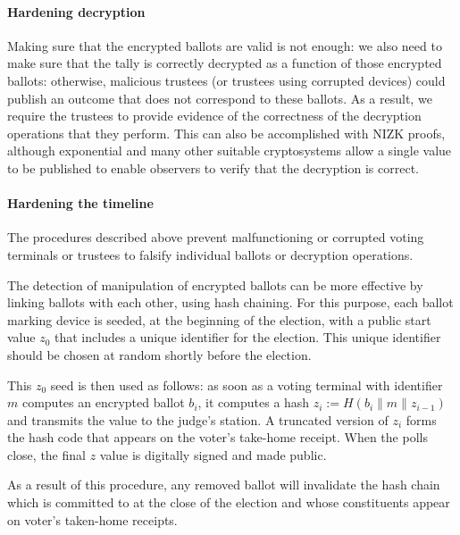 \paragraph{Hardening decryption}
\label{sec:hardening-decryption}
Making sure that the encrypted ballots are valid is not enough: we
also need to make sure that the tally is correctly decrypted as a
function of those encrypted ballots: otherwise, malicious trustees (or
trustees using corrupted devices) could publish an outcome that does
not correspond to these ballots. As a result, we require the trustees
to provide evidence of the correctness of the decryption operations
that they perform.  This can also be accomplished with NIZK proofs,
although exponential \elgamal and many other suitable cryptosystems
allow a single value to be published to enable observers to verify that
the decryption is correct.

\paragraph{Hardening the timeline}
\label{sec:hard-timeline}

The procedures described above prevent malfunctioning or corrupted
voting terminals or trustees to falsify individual ballots or decryption
operations.

The detection of manipulation of encrypted ballots can be more
effective by linking ballots with each other, using hash chaining.
For this purpose, each ballot marking device is seeded, at the beginning
of the election, with a public start value $z_0$ that includes a
unique identifier for the election.
This unique identifier should be chosen at random shortly before the
election.


This $z_0$ seed is then used as follows: as soon as a voting terminal
with identifier $m$ computes an encrypted ballot $b_i$, it
computes a hash $z_i := H(b_i \| m \| z_{i-1})$ and transmits the value
to the judge's station. A truncated version of $z_i$ forms the hash code
that appears on the voter's take-home receipt.  When the polls close,
the final $z$ value is digitally signed and made public.

As a result of this procedure, any removed ballot will
invalidate the hash chain which is committed to at the close of the
election and whose constituents appear on voter's taken-home receipts.


